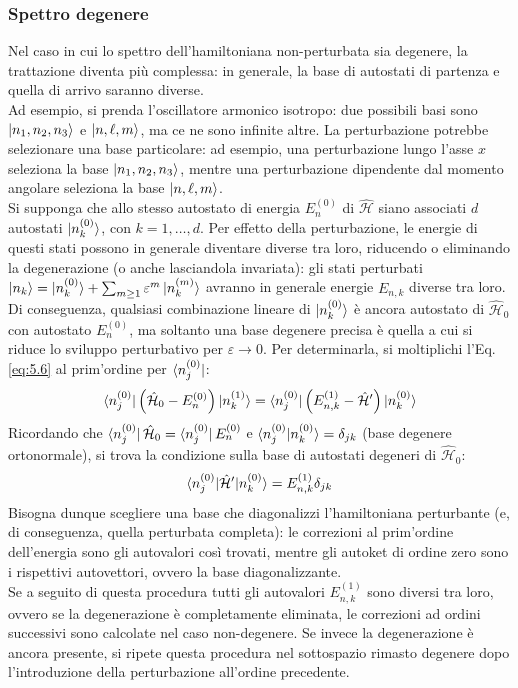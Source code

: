 \subsubsection{Spettro degenere}

Nel caso in cui lo spettro dell'hamiltoniana non-perturbata sia degenere, la trattazione diventa più complessa: in generale, la base di autostati di partenza e quella di arrivo saranno diverse.\\
Ad esempio, si prenda l'oscillatore armonico isotropo: due possibili basi sono $ \ket{n_1,n_2,n_3} $ e $ \ket{n,\ell,m} $, ma ce ne sono infinite altre. La perturbazione potrebbe selezionare una base particolare: ad esempio, una perturbazione lungo l'asse $ x $ seleziona la base $ \ket{n_1,n_2,n_3} $, mentre una perturbazione dipendente dal momento angolare seleziona la base $ \ket{n,\ell,m} $.\\
Si supponga che allo stesso autostato di energia $ E_n^{(0)} $ di $ \hat{\mathcal{H}} $ siano associati $ d $ autostati $ \ket{n^{(0)}_k} $, con $ k = 1, \dots, d $. Per effetto della perturbazione, le energie di questi stati possono in generale diventare diverse tra loro, riducendo o eliminando la degenerazione (o anche lasciandola invariata): gli stati perturbati $ \ket{n_k} = \ket{n^{(0)}_k} + \sum_{m \ge 1} \varepsilon^m \ket{n^{(m)}_k} $ avranno in generale energie $ E_{n,k} $ diverse tra loro.\\
Di conseguenza, qualsiasi combinazione lineare di $ \ket{n^{(0)}_k} $ è ancora autostato di $ \hat{\mathcal{H}}_0 $ con autostato $ E^{(0)}_n $, ma soltanto una base degenere precisa è quella a cui si riduce lo sviluppo perturbativo per $ \varepsilon \rightarrow 0 $. Per determinarla, si moltiplichi l'Eq. \ref{eq:5.6} al prim'ordine per $ \bra{n_j^{(0)}} $:
\begin{equation*}
	\braket{n^{(0)}_j | \left( \hat{\mathcal{H}}_0 - E^{(0)}_n \right) | n^{(1)}_k} = \braket{n^{(0)}_j | \left( E^{(1)}_{n,k} - \hat{\mathcal{H}}' \right) | n^{(0)}_k}
\end{equation*}
Ricordando che $ \bra{n^{(0)}_j} \hat{\mathcal{H}}_0 = \bra{n^{(0)}_j} E^{(0)}_n $ e $ \braket{n^{(0)}_j | n^{(0)}_k} = \delta_{jk} $ (base degenere ortonormale), si trova la condizione sulla base di autostati degeneri di $ \hat{\mathcal{H}}_0 $:
\begin{equation}
	\braket{n^{(0)}_j | \hat{\mathcal{H}}' | n^{(0)}_k} = E^{(1)}_{n,k} \delta_{jk}
	\label{eq:5.14}
\end{equation}
Bisogna dunque scegliere una base che diagonalizzi l'hamiltoniana perturbante (e, di conseguenza, quella perturbata completa): le correzioni al prim'ordine dell'energia sono gli autovalori così trovati, mentre gli autoket di ordine zero sono i rispettivi autovettori, ovvero la base diagonalizzante.\\
Se a seguito di questa procedura tutti gli autovalori $ E^{(1)}_{n,k} $ sono diversi tra loro, ovvero se la degenerazione è completamente eliminata, le correzioni ad ordini successivi sono calcolate nel caso non-degenere. Se invece la degenerazione è ancora presente, si ripete questa procedura nel sottospazio rimasto degenere dopo l'introduzione della perturbazione all'ordine precedente.

